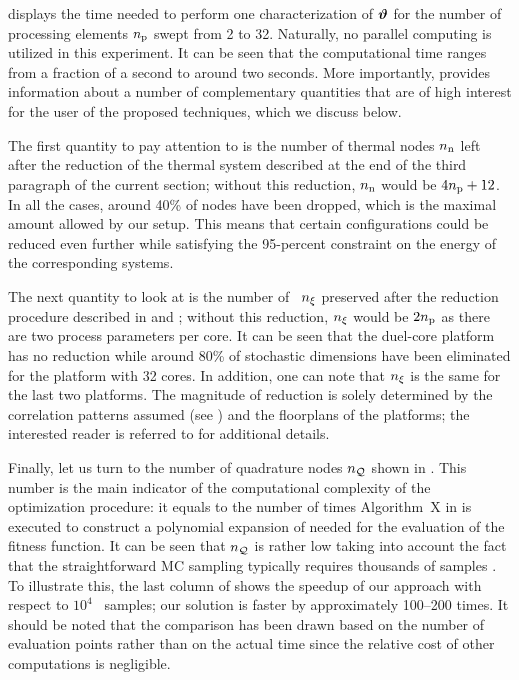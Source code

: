
 displays the time needed to perform one characterization of $\bm{\vartheta}$ for the number of processing elements ${n_\text{p}}$ swept from 2 to 32.
Naturally, no parallel computing is utilized in this experiment.
It can be seen that the computational time ranges from a fraction of a second to around two seconds.
More importantly,  provides information about a number of complementary quantities that are of high interest for the user of the proposed techniques, which we discuss below.

The first quantity to pay attention to is the number of thermal nodes ${n_\text{n}}$ left after the reduction of the thermal system described at the end of the third paragraph of the current section; without this reduction, ${n_\text{n}}$ would be $4 {n_\text{p}} + 12$.
In all the cases, around 40\% of nodes have been dropped, which is the maximal amount allowed by our setup.
This means that certain configurations could be reduced even further while satisfying the 95-percent constraint on the energy of the corresponding systems.

The next quantity to look at is the number of \rvs\ ${n_\xi}$ preserved after the reduction procedure described in  and ; without this reduction, ${n_\xi}$ would be $2 {n_\text{p}}$ as there are two process parameters per core.
It can be seen that the duel-core platform has no reduction while around 80\% of stochastic dimensions have been eliminated for the platform with 32 cores.
In addition, one can note that ${n_\xi}$ is the same for the last two platforms.
The magnitude of reduction is solely determined by the correlation patterns assumed (see ) and the floorplans of the platforms; the interested reader is referred to \cite{ukhov2014} for additional details.

Finally, let us turn to the number of quadrature nodes ${n_\mathcal{Q}}$ shown in .
This number is the main indicator of the computational complexity of the optimization procedure: it equals to the number of times Algorithm~X in  is executed to construct a polynomial expansion of  needed for the evaluation of the fitness function.
It can be seen that ${n_\mathcal{Q}}$ is rather low taking into account the fact that the straightforward MC sampling typically requires thousands of samples \cite{ukhov2014, lee2013, xiang2010, juan2012}.
To illustrate this, the last column of  shows the speedup of our approach with respect to $10^4$ \MC\ samples; our solution is faster by approximately 100--200 times.
It should be noted that the comparison has been drawn based on the number of evaluation points rather than on the actual time since the relative cost of other computations is negligible.
